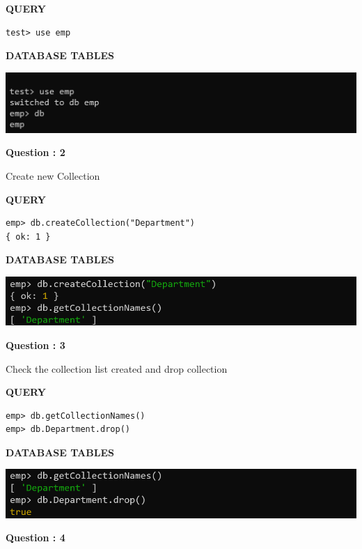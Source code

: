 \documentclass[a4paper,12pt]{report}
\begin{document}
\begin{flushleft}
\textbf{QUERY }
\end{flushleft}
 \begin{verbatim}
test> use emp
\end{verbatim}
\begin{flushleft}
\textbf{DATABASE TABLES}
\end{flushleft}
\includegraphics[scale=0.464]{M1c.png}

\begin{flushleft}
    \textbf{Question : 2}
\end{flushleft}
Create new Collection
\begin{flushleft}
\textbf{QUERY }
\end{flushleft}
 \begin{verbatim}
emp> db.createCollection("Department")
{ ok: 1 }
\end{verbatim}
\begin{flushleft}
\textbf{DATABASE TABLES}
\end{flushleft}
\includegraphics[scale=0.5]{create&getM.png}
\begin{flushleft}
    \textbf{Question : 3}
\end{flushleft}
Check the collection list created and drop collection
\begin{flushleft}
\textbf{QUERY }
\end{flushleft}
 \begin{verbatim}
emp> db.getCollectionNames()
emp> db.Department.drop()
\end{verbatim}
\newpage
\begin{flushleft}
\textbf{DATABASE TABLES}
\end{flushleft}
\includegraphics[scale=0.5]{M3.png}
\begin{flushleft}
    \textbf{Question : 4}
\end{flushleft}
\end{document}

